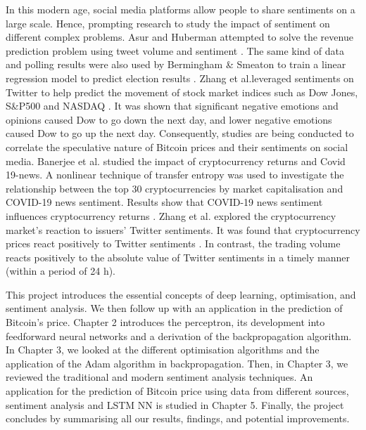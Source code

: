 \par In this modern age, social media platforms allow people to share sentiments on a large scale. Hence, prompting research to study the impact of sentiment on different complex problems. Asur and Huberman attempted to solve the revenue prediction problem using tweet volume and sentiment \cite{Asur2010}. The same kind of data and polling results were also used by Bermingham \& Smeaton to train a linear regression model to predict election results \cite{smeaton2011}. Zhang et al.leveraged sentiments on Twitter to help predict the movement of stock market indices such as Dow Jones, S\&P500 and NASDAQ \cite{Zhang2011}. It was shown that significant negative emotions and opinions caused Dow to go down the next day, and lower negative emotions caused Dow to go up the next day. Consequently, studies are being conducted to correlate the speculative nature of Bitcoin prices and their sentiments on social media. Banerjee et al. studied the impact of cryptocurrency returns and Covid 19-news. A nonlinear technique of transfer entropy was used to investigate the relationship between the top 30 cryptocurrencies by market capitalisation and COVID-19 news sentiment. Results show that COVID-19 news sentiment influences cryptocurrency returns \cite{Banerjee2022}. Zhang et al. explored the cryptocurrency market's reaction to issuers' Twitter sentiments. It was found that cryptocurrency prices react positively to Twitter sentiments \cite{Zhang2022}. In contrast, the trading volume reacts positively to the absolute value of Twitter sentiments in a timely manner (within a period of 24 h).

\par This project introduces the essential concepts of deep learning, optimisation, and sentiment analysis. We then follow up with an application in the prediction of Bitcoin's price. Chapter 2 introduces the perceptron, its development into feedforward neural networks and a derivation of the backpropagation algorithm. In Chapter 3, we looked at the different optimisation algorithms and the application of the Adam algorithm in backpropagation. Then, in Chapter 3, we reviewed the traditional and modern sentiment analysis techniques. An application for the prediction of Bitcoin price using data from different sources, sentiment analysis and LSTM NN is studied in Chapter 5. Finally, the project concludes by summarising all our results, findings, and potential improvements.









